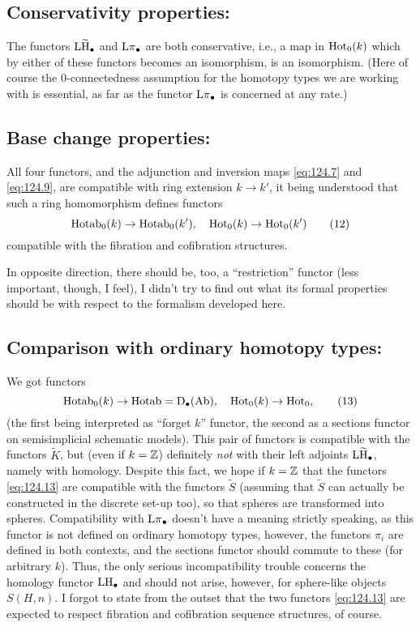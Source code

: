\subsection[Conservativity properties]{Conservativity properties:}
\label{subsec:124.E}%
The functors $\operatorname{L\widetilde H}_\bullet$ and $\operatorname{L\pi}_\bullet$ are both conservative,
i.e., a map in $\operatorname{Hot}_0(k)$ which by either of these functors becomes
an isomorphism, is an isomorphism. (Here of course the
$0$-connectedness assumption for the homotopy types we are working
with is essential, as far as the functor $\operatorname{L\pi}_\bullet$ is concerned
at any rate.)

\subsection[Base change properties]{Base change properties:}
\label{subsec:124.F}%
All four functors, and the adjunction and inversion maps
\eqref{eq:124.7} and \eqref{eq:124.9}, are compatible with ring
extension $k\to k'$, it being understood that such a ring homomorphism
defines functors
\begin{equation}
  \label{eq:124.12}
  \operatorname{Hotab}_0(k) \to \operatorname{Hotab}_0(k'), \quad
  \operatorname{Hot}_0(k) \to \operatorname{Hot}_0(k')\tag{12}
\end{equation}
compatible with the fibration and cofibration structures.

In opposite direction, there should be, too, a ``restriction'' functor
(less important, though, I feel), I didn't try to find out what its
formal properties should be with respect to the formalism developed
here.

\subsection[Comparison with ordinary homotopy types]{Comparison with
  ordinary homotopy types:}
\label{subsec:124.G}%
We got functors
\begin{equation}
  \label{eq:124.13}
  \operatorname{Hotab}_0(k) \to \operatorname{Hotab} = {\mathrm{D}}_\bullet{\ensuremath{(\mathrm{Ab})}}, \quad
  \operatorname{Hot}_0(k) \to \operatorname{Hot}_0,\tag{13}
\end{equation}
(the first being interpreted as ``forget $k$'' functor, the second as
a sections functor on semisimplicial schematic models). This pair
of functors is compatible with the functors $\widetilde
K$, but (even if $k={\mathbb{Z}}$) definitely \emph{not} with their left
adjoints $\operatorname{L\widetilde H}_\bullet$, namely with homology. Despite this fact, we
hope if $k={\mathbb{Z}}$ that the functors \eqref{eq:124.13} are compatible
with the functors $\widetilde S$ (assuming that $\widetilde S$ can
actually be constructed in the discrete set-up too), so that spheres
are transformed into spheres. Compatibility with $\operatorname{L\pi}_\bullet$
doesn't have a meaning strictly speaking, as this functor is not
defined on ordinary homotopy types, however, the functors $\pi_i$ are
defined in both contexts, and the sections functor should commute to
these (for arbitrary $k$). Thus, the only serious incompatibility
trouble concerns the homology functor $\operatorname{LH}_\bullet$ and should not
arise, however, for sphere-like objects $S(H,n)$. I forgot to state
from the outset that the two functors \eqref{eq:124.13} are expected
to respect fibration and cofibration sequence structures, of course.

